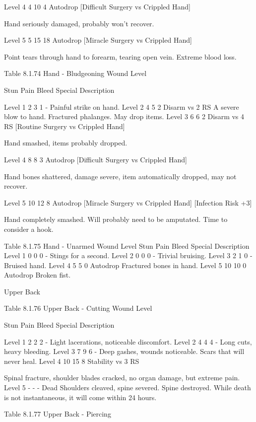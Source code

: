 \documentclass[oneside,11pt,english]{book}
\begin{document}
Level 4 4 10 4 Autodrop 
[Difficult Surgery vs 
Crippled Hand] 

Hand seriously damaged, probably won't recover. 

Level 5 5 15 18 Autodrop 
[Miracle Surgery vs 
Crippled Hand] 

Point tears through hand to forearm, tearing open 
vein. Extreme blood loss. 

 
Table 8.1.74 Hand - Bludgeoning 
Wound 
Level 

Stun Pain Bleed Special Description 


Level 1 2 3 1 - Painful strike on hand. 
Level 2 4 5 2 Disarm vs 2 RS A severe blow to hand. Fractured phalanges. 
May drop items. 
Level 3 6 6 2 Disarm vs 4 RS 
[Routine Surgery vs Crippled 
Hand] 

Hand smashed, items probably dropped. 

Level 4 8 8 3 Autodrop 
[Difficult Surgery vs Crippled 
Hand] 

Hand bones shattered, damage severe, item 
automatically dropped, may not recover. 

Level 5 10 12 8 Autodrop 
[Miracle Surgery vs Crippled 
Hand] [Infection Risk +3] 

Hand completely smashed. Will probably need 
to be amputated. Time to consider a hook. 

 
Table 8.1.75 Hand - Unarmed 
Wound Level Stun Pain Bleed Special Description 
Level 1 0 0 0 - Stings for a second. 
Level 2 0 0 0 - Trivial bruising. 
Level 3 2 1 0 - Bruised hand. 
Level 4 5 5 0 Autodrop Fractured bones in hand. 
Level 5 10 10 0 Autodrop Broken fist. 

 

 

Upper Back 

 

Table 8.1.76 Upper Back - Cutting 
Wound 
Level 

Stun Pain Bleed Special Description 

Level 1 2 2 2 - Light lacerations, noticeable discomfort. 
Level 2 4 4 4 - Long cuts, heavy bleeding. 
Level 3 7 9 6 - Deep gashes, wounds noticeable. Scars that will never heal. 
Level 4 10 15 8 Stability vs 
3 RS 

Spinal fracture, shoulder blades cracked, no organ damage, but 
extreme pain. 
Level 5 - - - Dead Shoulders cleaved, spine severed. Spine destroyed. While death 
is not instantaneous, it will come within 24 hours. 

 
Table 8.1.77 Upper Back - Piercing 
\end{document}
